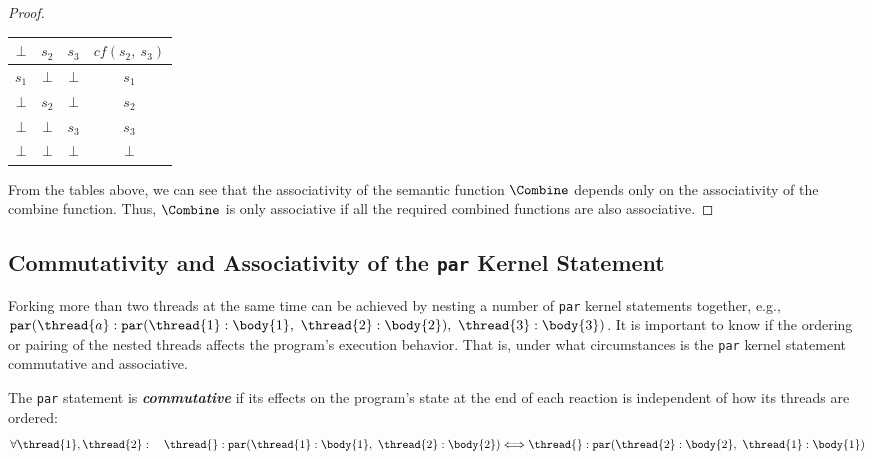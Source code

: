 \begin{proof}
\begin{center}
\begin{tabular}{| c c c || c | c |}
			$\bot$				& $s_2$				& $s_3$				& \multicolumn{2}{c|}{$cf(s_2,~s_3)$}															\\ \hline
			$s_1$				& $\bot$			& $\bot$			& \multicolumn{2}{c|}{$s_1$}																	\\ \hline
			$\bot$				& $s_2$				& $\bot$			& \multicolumn{2}{c|}{$s_2$}																	\\ \hline
			$\bot$				& $\bot$			& $s_3$				& \multicolumn{2}{c|}{$s_3$}																	\\ \hline
			$\bot$				& $\bot$			& $\bot$			& \multicolumn{2}{c|}{$\bot$}																	\\
			\hline
		\end{tabular}
	\end{center}
	From the tables above, we can see that the associativity
	of the semantic function $\Combine$ depends only on the 
	associativity of the combine function.
	Thus, $\Combine$ is only associative
	if all the required combined functions are also associative.
\end{proof}


\subsection{Commutativity and Associativity of the \texttt{par} Kernel Statement}
Forking more than two threads at the same time can be achieved by 
nesting a number of \verb$par$ kernel statements together, e.g., 
$\mathtt{par}(\thread{a}:\mathtt{par}(\thread{1}:\body{1},~\thread{2}:\body{2}),~\thread{3}:\body{3})$.
It is important to know if the ordering or pairing of the
nested threads affects the program's execution behavior. That is,
under what circumstances is the \verb$par$ kernel statement 
commutative and associative.

\begin{definition}
	\label{def:commutative_par}
	The \verb$par$ statement is \emph{\textbf{commutative}} if its effects
	on the program's state at the end of each reaction is independent of how its
	threads are ordered:
	\begin{equation*}
		\forall \thread{1}, \thread{2}:
		\quad
		\thread{}:\mathtt{par}(\thread{1}:\body{1},~\thread{2}:\body{2})
		\Longleftrightarrow
		\thread{}:\mathtt{par}(\thread{2}:\body{2},~\thread{1}:\body{1})
	\end{equation*}
\end{definition}

